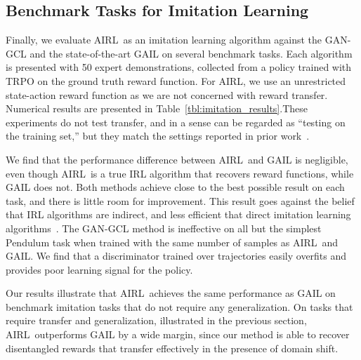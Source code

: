 \documentclass{article} \usepackage{iclr2018_conference,times}
\newcommand{\algnameabbrev}{AIRL}
\begin{document}
\subsection{Benchmark Tasks for Imitation Learning}

Finally, we evaluate \algnameabbrev\ as an imitation learning algorithm against the GAN-GCL and the state-of-the-art GAIL on several benchmark tasks. Each algorithm is presented with 50 expert demonstrations, collected from a policy trained with TRPO on the ground truth reward function. For AIRL, we use an unrestricted state-action reward function as we are not concerned with reward transfer. Numerical results are presented in Table~\ref{tbl:imitation_results}.These experiments do not test transfer, and in a sense can be regarded as ``testing on the training set,'' but they match the settings reported in prior work~\citep{Ho16b}.

We find that the performance difference between \algnameabbrev\ and GAIL is negligible, even though  \algnameabbrev\ is a true IRL algorithm that recovers reward functions, while GAIL does not. Both methods achieve close to the best possible result on each task, and there is little room for improvement. This result goes against the belief that IRL algorithms are indirect, and less efficient that direct imitation learning algorithms~\citep{Ho16b}. The GAN-GCL method is ineffective on all but the simplest Pendulum task when trained with the same number of samples as \algnameabbrev\ and GAIL. We find that a discriminator trained over trajectories easily overfits and provides poor learning signal for the policy.

Our results illustrate that \algnameabbrev\ achieves the same performance as GAIL on benchmark imitation tasks that do not require any generalization. On tasks that require transfer and generalization, illustrated in the previous section, \algnameabbrev\ outperforms GAIL by a wide margin, since our method is able to recover disentangled rewards that transfer effectively in the presence of domain shift.
\end{document}
